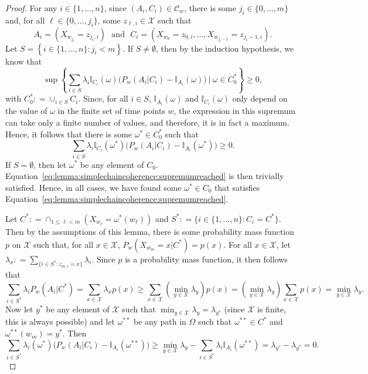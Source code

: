 \documentclass[10pt]{paper}
\theoremstyle{definition}
\newcommand{\states}{\mathcal{X}}
\newcommand{\ind}[1]{\mathbb{I}_{#1}}
\newcommand{\coloneqq}{:\!=}
\begin{document}
\begin{proof}
For any $i\in\{1,\dots,n\}$, since $(A_i,C_i)\in\mathcal{C}_w$, there is some $j_i\in\{0,\dots,m\}$ and, for all $\ell\in\{0,\dots,j_i\}$, some $z_{\ell,i}\in\states$ such that
\begin{equation*}
A_i=(X_{w_{j_i}}=z_{j_i,i})
\text{~~and~~}
C_i=(X_{w_{0}}=z_{0,i}, \dots, X_{w_{j_i-1}}=z_{j_i-1,i}).
\end{equation*}
Let $S=\left\{i\in\{1,\dots,n\}\colon j_i<m\right\}$. If $S\neq\emptyset$, then by the induction hypothesis, we know that
\begin{equation*}
\sup\left\{\sum_{i\in S}\lambda_i\ind{C_i}(\omega)\bigl(P_w(A_i\vert C_i)-\ind{A_i}(\omega)\bigr)~\Bigg\vert~\omega\in C_0^*\right\}\geq0,
\end{equation*}
with $C_0^*\coloneqq\cup_{i\in S}C_i$. Since, for all $i\in S$, $\ind{A_i}(\omega)$ and $\ind{C_i}(\omega)$ only depend on the value of $\omega$ in the finite set of time points $w$, the expression in this supremum can take only a finite number of values, and therefore, it is in fact a maximum. Hence, it follows that there is some $\omega^*\in C_0^*$ such that
\begin{equation}\label{eq:lemma:simplechaincoherence:supremumreached}
\sum_{i\in S}\lambda_i\ind{C_i}(\omega^*)\bigl(P_w(A_i\vert C_i)-\ind{A_i}(\omega^*)\bigr)\geq0.
\end{equation}
If $S=\emptyset$, then let $\omega^*$ be any element of $C_0$. Equation~\eqref{eq:lemma:simplechaincoherence:supremumreached} is then trivially satisfied. Hence, in all cases, we have found some $\omega^*\in C_0$ that satisfies Equation~\eqref{eq:lemma:simplechaincoherence:supremumreached}.


Let $C^*\coloneqq\cap_{1\leq \ell<m}(X_{w_\ell}=\omega^*(w_\ell))$ and $S^*\coloneqq\{i\in\{1,\dots,n\}\colon C_i=C^*\}$. Then by the assumptions of this lemma, there is some probability mass function $p$ on $\states$ such that, for all $x\in\states$, $P_w(X_{w_m}=x\vert C^*)=p(x)$. 
For all $x\in\states$, let $\lambda_x\coloneqq\sum_{\{i\in S^*\colon z_{m,i}=x\}}\lambda_i$.
Since $p$ is a probability mass function, it then follows that
\begin{equation*}
\sum_{i\in S^*}\lambda_i P_w(A_i\vert C^*)
=
\sum_{x\in\states}
\lambda_x p(x)
\geq
\sum_{x\in\states} \left(\min_{y\in\states}\lambda_y\right) p(x)
=
\left(\min_{y\in\states}\lambda_y\right)\sum_{x\in\states}p(x)
=\min_{y\in\states}\lambda_y.
\end{equation*}
Now let $y^*$ be any element of $\states$ such that $\min_{y\in\states}\lambda_y=\lambda_{y^*}$ (since $\states$ is finite, this is always possible) and let $\omega^{**}$ be any path in $\Omega$ such that $\omega^{**}\in C^*$ and $\omega^{**}(w_m)=y^*$. Then
\begin{equation*}
\sum_{i\in S^*}\lambda_i(\omega^*)\bigl(P_w(A_i\vert C_i)-\ind{A_i}(\omega^{**})\bigr)
\geq
\min_{y\in\states}\lambda_y
-\sum_{i\in S^*}\lambda_i\ind{A_i}(\omega^{**})
=\lambda_{y^*}-\lambda_{y^*}=0.
\end{equation*}


\end{proof}
\end{document}
